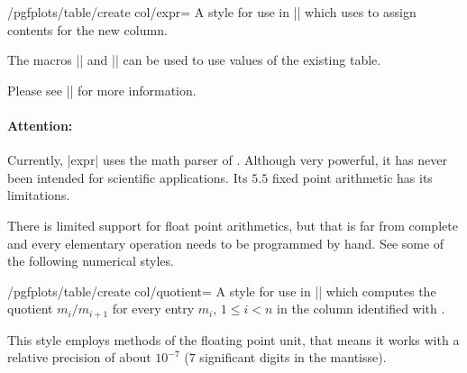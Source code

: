 \begin{stylekey}{/pgfplots/table/create col/expr=}
	A style for use in |\pgfplotstablecreatecol| which uses  to assign contents for the new column.

\begin{codeexample}[]
\table
{}\table

\pgfplotstabletypeset[
	columns={level,new},
	columns/new/.style={column name=$2\cdot $level}
]\table
\end{codeexample}
	The macros |\thisrow| and |\nextrow| can be used to use values of the existing table.

	Please see |\pgfplotstablecreatecol| for more information.

	\paragraph{Attention:} Currently, |expr| uses the math parser of \PGF. Although very powerful, it has never been intended for scientific applications. Its $5.5$ fixed point arithmetic has its limitations.

	There is limited support for float point arithmetics, but that is far from complete and every elementary operation needs to be programmed by hand. See some of the following numerical styles.
\end{stylekey}

\begin{stylekey}{/pgfplots/table/create col/quotient=}
	A style for use in |\pgfplotstablecreatecol| which computes the quotient $m_i / m_{i+1}$ for every entry $m_i$, $1\le i <n$ in the column identified with .

\begin{codeexample}[]
\table
{}\table
{}\table

\pgfplotstabletypeset[
	columns={error1,error2,quot1,quot2},
	columns/error1/.style={sci,sci zerofill},
	columns/error2/.style={sci,sci zerofill},
	columns/quot1/.style={dec sep align},
	columns/quot2/.style={dec sep align},
]\table
\end{codeexample}
	This style employs methods of the floating point unit, that means it works with a relative precision of about $10^{-7}$ ($7$ significant digits in the mantisse).
\end{stylekey}


